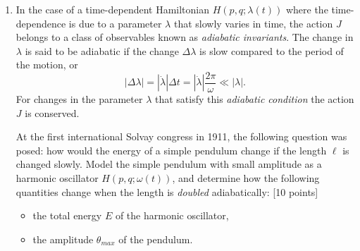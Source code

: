 \documentclass[letterpaper,11pt]{article}
\begin{document}
\begin{enumerate}[resume]
 \item In the case of a time-dependent Hamiltonian $H\left(p,q;\lambda(t)\right)$ where the time-dependence is due to a parameter $\lambda$ that slowly varies in time, the action $J$ belongs to a class of observables known as \emph{adiabatic invariants}.  The change in $\lambda$ is said to be adiabatic if the change $\Delta\lambda$ is slow compared to the period of the motion, or
 \begin{equation*}
  |\Delta\lambda| = |\dot\lambda| \Delta t = |\dot\lambda| \frac{2\pi}{\omega} \ll |\lambda|.
 \end{equation*}
 For changes in the parameter $\lambda$ that satisfy this \emph{adiabatic condition} the action $J$ is conserved.

 At the first international Solvay congress in 1911, the following question was posed: how would the energy of a simple pendulum change if the length $\ell$ is changed slowly.  Model the simple pendulum with small amplitude as a harmonic oscillator $H\left(p,q;\omega(t)\right)$, and determine how the following quantities change when the length is \emph{doubled} adiabatically: [10 points]
 \begin{itemize}
  \item the total energy $E$ of the harmonic oscillator,
  \item the amplitude $\theta_{max}$ of the pendulum.
 \end{itemize}
\end{enumerate}
\end{document}
